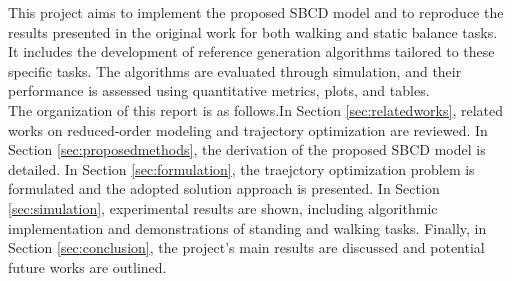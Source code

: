 \documentclass[main.tex]{subfiles}
\begin{document}
\begin{sloppypar}
This project aims to implement the proposed SBCD model and to reproduce the results presented in the original work for both walking and static balance tasks. It includes the development of reference generation algorithms tailored to these specific tasks. The algorithms are evaluated through simulation, and their performance is assessed using quantitative metrics, plots, and tables.\\
The organization of this report is as follows.In Section \ref{sec:relatedworks}, related works on reduced-order modeling and trajectory optimization are reviewed. In Section \ref{sec:proposedmethods}, the derivation of the proposed SBCD model is detailed. In Section \ref{sec:formulation}, the traejctory optimization problem is formulated and the adopted solution approach is presented. In Section \ref{sec:simulation}, experimental results are shown, including algorithmic implementation and demonstrations of standing and walking tasks. Finally, in Section \ref{sec:conclusion}, the project's main results are discussed and potential future works are outlined.
\end{sloppypar}
\end{document}
